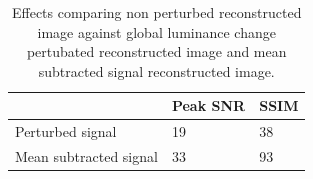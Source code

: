 \begin{table}[H]
    \centering
  \begin{tabular}{ | l | l | l |}
    \hline
     & Peak SNR  & SSIM \\ \hline
    Perturbed signal & 19  & 38 \\ \hline
    Mean subtracted signal & 33  & 93 \\
    \hline
  \end{tabular}
      \caption{Effects comparing non perturbed reconstructed image against global luminance change pertubated reconstructed image and mean subtracted signal reconstructed image.}
    \label{tab:lum_dyn}
\end{table}




